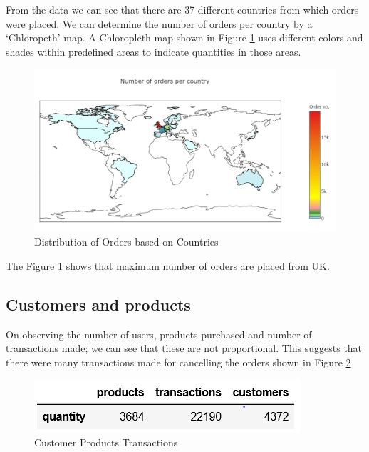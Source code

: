 From the data we can see that there are 37 different countries from which orders were placed. We can determine the number of orders per country by a  `Chloropeth' map. A Chloropleth map shown in Figure \ref{country} uses different colors and shades within predefined areas to indicate quantities in those areas. \\

\begin{figure}
\caption{Distribution of Orders based on Countries}
\label{country}
\centering
\includegraphics[width=\columnwidth]{images/chloropleth.PNG}
\end{figure}

The Figure \ref{country} shows that maximum number of orders are placed from UK.

\subsection{Customers and products}

On observing the number of users, products purchased and number of transactions made; we can see that these are not proportional. This suggests that there were many transactions made for cancelling the orders shown in Figure \ref{2.1}\\

\begin{figure}
\caption{Customer Products Transactions}
\label{2.1}
\centering
\includegraphics[width=\columnwidth]{images/2_1.PNG}
\end{figure}

